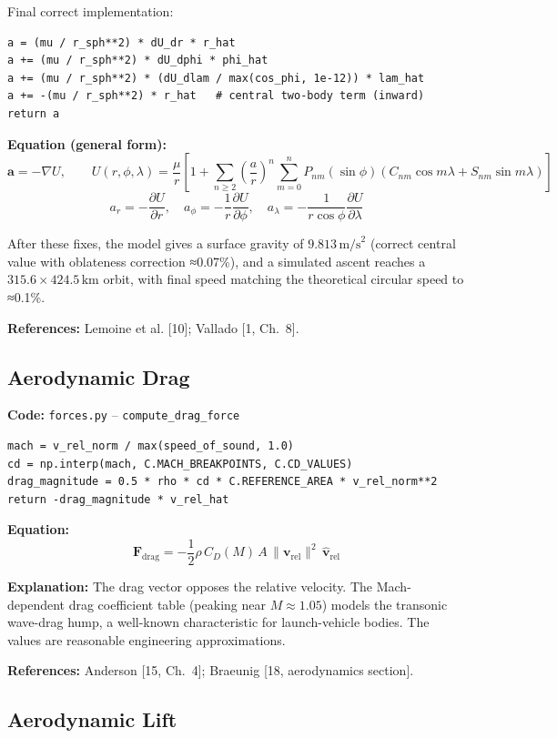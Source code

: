 \documentclass[12pt,a4paper]{article}
\begin{document}
Final correct implementation:
\begin{verbatim}
a = (mu / r_sph**2) * dU_dr * r_hat
a += (mu / r_sph**2) * dU_dphi * phi_hat
a += (mu / r_sph**2) * (dU_dlam / max(cos_phi, 1e-12)) * lam_hat
a += -(mu / r_sph**2) * r_hat   # central two-body term (inward)
return a
\end{verbatim}

\textbf{Equation (general form):}
\[
\mathbf{a} = -\nabla U,\qquad U(r,\phi,\lambda) = \frac{\mu}{r}\left[1 + \sum_{n\ge2}\left(\frac{a}{r}\right)^n \sum_{m=0}^n P_{nm}(\sin\phi)(C_{nm}\cos m\lambda + S_{nm}\sin m\lambda)\right]
\]
\[
a_r = -\frac{\partial U}{\partial r},\quad
a_\phi = -\frac{1}{r}\frac{\partial U}{\partial \phi},\quad
a_\lambda = -\frac{1}{r\cos\phi}\frac{\partial U}{\partial \lambda}
\]

After these fixes, the model gives a surface gravity of $9.813\,\text{m/s}^2$ (correct central value with oblateness correction ≈0.07\%), and a simulated ascent reaches a $315.6\times424.5\,\text{km}$ orbit, with final speed matching the theoretical circular speed to ≈0.1\%.

\textbf{References:} Lemoine et al. [10]; Vallado [1, Ch.~8].

\subsection{Aerodynamic Drag}

\textbf{Code:} \texttt{forces.py} – \texttt{compute\_drag\_force}
\begin{verbatim}
mach = v_rel_norm / max(speed_of_sound, 1.0)
cd = np.interp(mach, C.MACH_BREAKPOINTS, C.CD_VALUES)
drag_magnitude = 0.5 * rho * cd * C.REFERENCE_AREA * v_rel_norm**2
return -drag_magnitude * v_rel_hat
\end{verbatim}

\textbf{Equation:}
\[
\mathbf{F}_{\text{drag}} = -\frac{1}{2}\rho\,C_D(M)\,A\,\|\mathbf{v}_{\text{rel}}\|^2\,\hat{\mathbf{v}}_{\text{rel}}
\]

\textbf{Explanation:} The drag vector opposes the relative velocity. The Mach-dependent drag coefficient table (peaking near $M\approx1.05$) models the transonic wave-drag hump, a well-known characteristic for launch-vehicle bodies. The values are reasonable engineering approximations.

\textbf{References:} Anderson [15, Ch.~4]; Braeunig [18, aerodynamics section].

\subsection{Aerodynamic Lift}
\end{document}
